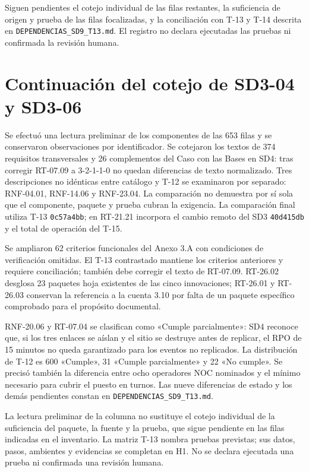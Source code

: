 \documentclass[11pt,letterpaper]{article}
\begin{document}
Siguen pendientes el cotejo individual de las filas restantes, la suficiencia de origen y prueba de las filas focalizadas, y la conciliación con T-13 y T-14 descrita en \texttt{DEPENDENCIAS\_SD9\_T13.md}. El registro no declara ejecutadas las pruebas ni confirmada la revisión humana.

\section*{Continuación del cotejo de SD3-04 y SD3-06}

Se efectuó una lectura preliminar de los componentes de las 653 filas y se conservaron observaciones por identificador. Se cotejaron los textos de 374 requisitos transversales y 26 complementos del Caso con las Bases en SD4: tras corregir RT-07.09 a 3-2-1-1-0 no quedan diferencias de texto normalizado. Tres descripciones no idénticas entre catálogo y T-12 se examinaron por separado: RNF-04.01, RNF-14.06 y RNF-23.04. La comparación no demuestra por sí sola que el componente, paquete y prueba cubran la exigencia. La comparación final utiliza T-13 \texttt{0c57a4bb}; en RT-21.21 incorpora el cambio remoto del SD3 \texttt{40d415db} y el total de operación del T-15.

Se ampliaron 62 criterios funcionales del Anexo 3.A con condiciones de verificación omitidas. El T-13 contrastado mantiene los criterios anteriores y requiere conciliación; también debe corregir el texto de RT-07.09. RT-26.02 desglosa 23 paquetes hoja existentes de las cinco innovaciones; RT-26.01 y RT-26.03 conservan la referencia a la cuenta 3.10 por falta de un paquete específico comprobado para el propósito documental.

RNF-20.06 y RT-07.04 se clasifican como «Cumple parcialmente»: SD4 reconoce que, si los tres enlaces se aíslan y el sitio se destruye antes de replicar, el RPO de 15 minutos no queda garantizado para los eventos no replicados. La distribución de T-12 es 600 «Cumple», 31 «Cumple parcialmente» y 22 «No cumple». Se precisó también la diferencia entre ocho operadores NOC nominados y el mínimo necesario para cubrir el puesto en turnos. Las nueve diferencias de estado y los demás pendientes constan en \texttt{DEPENDENCIAS\_SD9\_T13.md}.

La lectura preliminar de la columna no sustituye el cotejo individual de la suficiencia del paquete, la fuente y la prueba, que sigue pendiente en las filas indicadas en el inventario. La matriz T-13 nombra pruebas previstas; sus datos, pasos, ambientes y evidencias se completan en H1. No se declara ejecutada una prueba ni confirmada una revisión humana.
\end{document}
